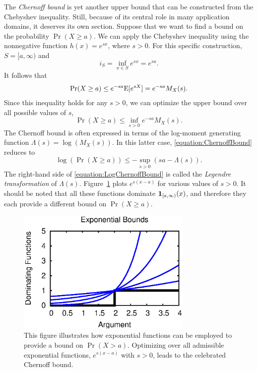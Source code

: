 The \emph{Chernoff bound} is yet another upper bound that can be constructed from the Chebyshev inequality. 
Still, because of its central role in many application domains, it deserves its own section.
Suppose that we want to find a bound on the probability $\Pr (X \geq a)$.
We can apply the Chebyshev inequality using the nonnegative function $h(x) = e^{sx}$, where $s > 0$.
For this specific construction, $S = [a, \infty)$ and
\begin{equation*}
i_S = \inf_{x \in S} e^{sx} = e^{sa} .
\end{equation*}
It follows that
\begin{equation*}
\Pr (X \geq a) \leq e^{-sa} \mathrm{E}[ e^{sX} ] = e^{-sa} M_X(s) .
\end{equation*}
Since this inequality holds for any $s > 0$, we can optimize the upper bound over all possible values of $s$,
\begin{equation} \label{equation:ChernoffBound}
\Pr (X \geq a) \leq \inf_{s > 0} e^{-sa} M_X(s) .
\end{equation}
The Chernoff bound is often expressed in terms of the log-moment generating function $\Lambda (s) = \log \left( M_X (s) \right)$.
In this latter case, \eqref{equation:ChernoffBound} reduces to
\begin{equation} \label{equation:LogChernoffBound}
\log \left( \Pr (X \geq a) \right) \leq - \sup_{s > 0} \left( sa - \Lambda (s) \right) .
\end{equation}
The right-hand side of \eqref{equation:LogChernoffBound} is called the \emph{Legendre transformation} of $\Lambda (s)$. 
Figure~\ref{figure:ChernoffBound} plots $e^{s(x-a)}$ for various values of $s > 0$.
It should be noted that all these functions dominate $\mathbf{1}_{[a, \infty)}(x)$, and therefore they each provide a different bound on $\Pr (X \geq a)$.

\begin{figure}[ht]
\begin{center}
\includegraphics[width=8.5cm]{Figures/10chapter/chernoff_bound}
\end{center}
\caption{This figure illustrates how exponential functions can be employed to provide a bound on $\Pr (X > a)$.
Optimizing over all admissible exponential functions, $e^{s(x-a)}$ with $s > 0$, leads to the celebrated Chernoff bound.}
\label{figure:ChernoffBound}
\end{figure}


